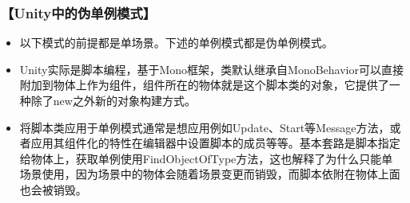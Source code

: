 \documentclass[9pt, b5paper]{article}
\begin{document}
\subsubsection{【Unity中的伪单例模式】}
\label{sec:orga8e0f06}
\begin{itemize}
\item 以下模式的前提都是单场景。下述的单例模式都是伪单例模式。
\item Unity实际是脚本编程，基于Mono框架，类默认继承自MonoBehavior可以直接附加到物体上作为组件，组件所在的物体就是这个脚本类的对象，它提供了一种除了new之外新的对象构建方式。
\item 将脚本类应用于单例模式通常是想应用例如Update、Start等Message方法，或者应用其组件化的特性在编辑器中设置脚本的成员等等。基本套路是脚本指定给物体上，获取单例使用FindObjectOfType方法，这也解释了为什么只能单场景使用，因为场景中的物体会随着场景变更而销毁，而脚本依附在物体上面也会被销毁。
\end{itemize}
\end{document}
